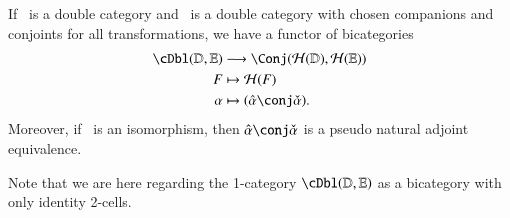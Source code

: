 
\begin{thm}\label{thm:h-locfr}
  If \lD\ is a double category and \lE\ is a  double category
  with chosen companions and conjoints for all transformations, we have a functor of bicategories
  \begin{align}
    \cDbl(\lD,\lE) &\too \Conj(\cH(\lD),\cH(\lE))\\
    F &\mapsto \cH(F)\\
    \al &\mapsto (\alhat\conj\alchk).
  \end{align}
  Moreover, if \al\ is an isomorphism, then $\alhat\conj\alchk$ is a
  pseudo natural adjoint equivalence.
\end{thm}

Note that we are here regarding the 1-category $\cDbl(\lD,\lE)$ as a
bicategory with only identity 2-cells.

